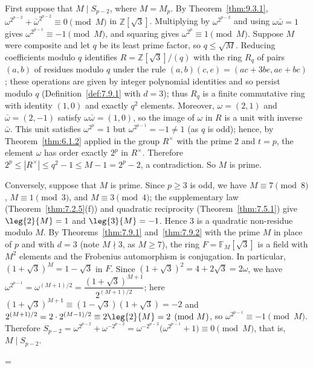 \documentclass[11pt]{article}
\makeatletter
\theoremstyle{ntstyle}
\let\nt@closedisplay\]
\def\nt@guardedclose{\@ifnextchar\par{\nt@closeafterpar}{\@ifnextchar\end{\postdisplaypenalty\@M\nt@closedisplay}{\nt@closedisplay}}}
\def\nt@closeafterpar\par{\@ifnextchar\par{\nt@closeafterpar}{\@ifnextchar\end{\postdisplaypenalty\@M\nt@closedisplay\par}{\nt@closedisplay\par}}}
\renewenvironment{proof}[1][\proofname]{\par
  \pushQED{\qed}\normalfont\topsep\medskipamount\edef\nt@afterproof{\@endparpenalty=\the\@endparpenalty\relax}\@beginparpenalty\@M\@endparpenalty\@M\let\]\nt@guardedclose\trivlist\item[]\textit{#1\@addpunct{.}} \ignorespaces}{\ifvmode\addpenalty\@M\fi\popQED\nt@afterproof\endtrivlist\@endpefalse}
\makeatother
\begin{document}
\begin{proof} First suppose that $M\mid S_{p-2}$, where $M=M_p$.
	By Theorem~\ref{thm:9.3.1},
	$\omega^{2^{p-2}}+\bar\omega^{2^{p-2}}\equiv0\pmod{M}$ in
	$\mathbb{Z}[\sqrt{3}]$. Multiplying by $\omega^{2^{p-2}}$ and using
	$\omega\bar\omega=1$ gives $\omega^{2^{p-1}}\equiv-1\pmod{M}$, and
	squaring gives $\omega^{2^{p}}\equiv1\pmod{M}$. Suppose $M$ were
	composite and let $q$ be its least prime factor, so $q\le\sqrt{M}$.
	Reducing coefficients modulo $q$ identifies
	$R=\mathbb{Z}[\sqrt{3}]/(q)$ with the ring $R_q$ of pairs $(a,b)$ of
	residues modulo $q$ under the rule $(a,b)(c,e)=(ac+3be,ae+bc)$; these
	operations are given by integer polynomial identities and so persist modulo $q$
	(Definition~\ref{def:7.9.1} with $d=3$); thus $R_q$ is a finite commutative
	ring with identity $(1,0)$ and exactly $q^{2}$ elements.
	Moreover, $\omega=(2,1)$ and $\bar\omega=(2,-1)$ satisfy
	$\omega\bar\omega=(1,0)$, so the image of $\omega$ in $R$ is a unit with inverse $\bar\omega$. This
	unit satisfies $\omega^{2^{p}}=1$ but $\omega^{2^{p-1}}=-1\neq1$ (as
	$q$ is odd); hence, by Theorem~\ref{thm:6.1.2} applied in the group $R^{\times}$ with
	the prime $2$ and $t=p$, the element $\omega$ has order exactly $2^{p}$ in
	$R^{\times}$.
	Therefore $2^{p}\le|R^{\times}|\le q^2-1\le M-1=2^{p}-2$, a contradiction. So $M$ is prime.

	Conversely, suppose that $M$ is prime. Since
	$p\ge3$ is odd, we have $M\equiv7\pmod{8}$, $M\equiv1\pmod{3}$, and
	$M\equiv3\pmod{4}$; the supplementary law (Theorem~\ref{thm:7.2.5}(f)) and
	quadratic reciprocity (Theorem~\ref{thm:7.5.1})
	give $\leg{2}{M}=1$ and $\leg{3}{M}=-1$. Hence
	$3$ is a quadratic non-residue modulo $M$. By
	Theorems~\ref{thm:7.9.1} and~\ref{thm:7.9.2} with the prime $M$ in place of $p$ and with $d=3$ (note $M\nmid3$, as $M\ge7$),
	the ring $F=\mathbb{F}_M[\sqrt{3}]$ is a field with $M^2$ elements and the
	Frobenius automorphism is conjugation. In particular,
	$(1+\sqrt{3})^{M}=1-\sqrt{3}$ in $F$. Since
	$(1+\sqrt{3})^2=4+2\sqrt{3}=2\omega$,
	we have $\omega^{2^{p-1}}=\omega^{(M+1)/2}=\dfrac{(1+\sqrt{3})^{M+1}}{2^{(M+1)/2}}$;
	here $(1+\sqrt{3})^{M+1}\equiv(1-\sqrt{3})(1+\sqrt{3})=-2$ and
	$2^{(M+1)/2}=2\cdot2^{(M-1)/2}\equiv2\leg{2}{M}=2\pmod{M}$,
	so $\omega^{2^{p-1}}\equiv-1\pmod{M}$. Therefore
	$S_{p-2}=\omega^{2^{p-2}}+\omega^{-2^{p-2}}=\omega^{-2^{p-2}}\big(\omega^{2^{p-1}}+1\big)\equiv0\pmod{M}$, that is, $M\mid S_{p-2}$.

\end{proof}
\end{document}
